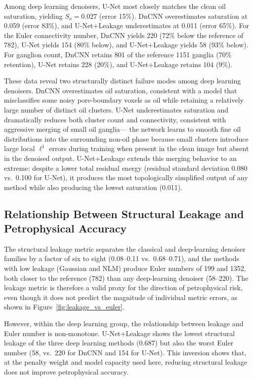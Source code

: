 \documentclass[review,12pt]{elsarticle}
\begin{document}
Among deep learning denoisers, U-Net most closely matches the clean oil
saturation, yielding $S_o = 0.027$ (error 15\%).  DnCNN overestimates
saturation at 0.059 (error 83\%), and U-Net+Leakage underestimates at
0.011 (error 65\%).  For the Euler connectivity number, DnCNN yields
220 (72\% below the reference of 782), U-Net yields 154 (80\% below),
and U-Net+Leakage yields 58 (93\% below).  For ganglion count, DnCNN
retains 801 of the reference 1151 ganglia (70\% retention), U-Net
retains 228 (20\%), and U-Net+Leakage retains 104 (9\%).

These data reveal two structurally distinct failure modes among deep
learning denoisers.  DnCNN overestimates oil saturation, consistent with
a model that misclassifies some noisy pore-boundary voxels as oil while
retaining a relatively large number of distinct oil clusters.  U-Net
underestimates saturation and dramatically reduces both cluster count and
connectivity, consistent with aggressive merging of small oil ganglia---
the network learns to smooth fine oil distributions into the surrounding
non-oil phase because small clusters introduce large local $\ell^1$
errors during training when present in the clean image but absent in the
denoised output.  U-Net+Leakage extends this merging behavior to an
extreme: despite a lower total residual energy (residual standard
deviation 0.080 vs.\ 0.100 for U-Net), it produces the most
topologically simplified output of any method while also producing the
lowest saturation (0.011).

\subsection{Relationship Between Structural Leakage and Petrophysical Accuracy}
\label{sec:results:relationship}

The structural leakage metric separates the classical and deep-learning
denoiser families by a factor of six to eight (0.08--0.11 vs.\
0.68--0.71), and the methods with low leakage (Gaussian and NLM) produce
Euler numbers of 199 and 1352, both closer to the reference (782) than
any deep-learning denoiser (58--220).  The leakage metric is therefore
a valid proxy for the direction of petrophysical risk, even though it
does not predict the magnitude of individual metric errors, as shown in
Figure~\ref{fig:leakage_vs_euler}.

However, within the deep learning group, the relationship between
leakage and Euler number is non-monotone.  U-Net+Leakage shows the
lowest structural leakage of the three deep learning methods (0.687) but
also the worst Euler number (58, vs.\ 220 for DnCNN and 154 for
U-Net).  This inversion shows that, at the penalty weight and model
capacity used here, reducing structural leakage does not improve
petrophysical accuracy.
\end{document}
